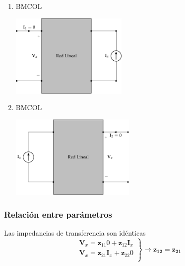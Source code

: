 \begin{enumerate}
\item \hfill{}\textsc{BMCOL}
\label{sec:org664d831}
\begin{center}
\includegraphics[height=4cm]{../figs/reciprocidadZ_entrada.pdf}
\end{center}
\item \hfill{}\textsc{BMCOL}
\label{sec:orge37f911}
\begin{center}
\includegraphics[height=4cm]{../figs/reciprocidadZ_salida.pdf}
\end{center}
\end{enumerate}
\subsubsection{Relación entre parámetros}
\label{sec:orgaf2fabb}
Las impedancias de transferencia son idénticas
\[
  \left.
    \begin{array}{l}
      \mathbf{V}_x = \mathbf{z}_{11} 0  + \mathbf{z}_{12} \mathbf{I}_x\\
      \mathbf{V}_x = \mathbf{z}_{21} \mathbf{I}_x + \mathbf{z}_{22} 0\\
    \end{array} \right\} \rightarrow \boxed{\mathbf{z_{12}} = \mathbf{z_{21}}}
\]


